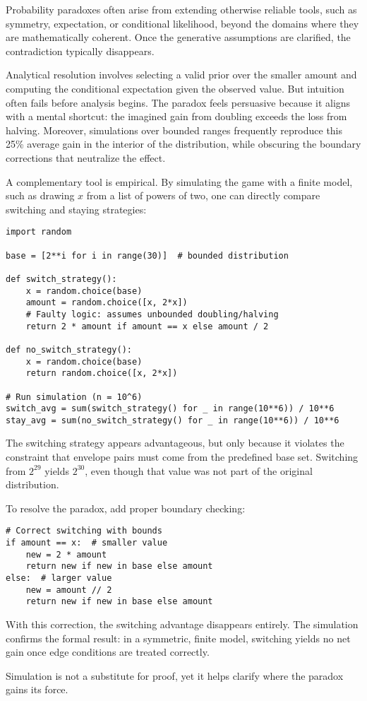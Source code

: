 \begin{commentary}
Probability paradoxes often arise from extending otherwise reliable tools, such as symmetry, expectation, or conditional likelihood, beyond the domains where they are mathematically coherent. Once the generative assumptions are clarified, the contradiction typically disappears.

Analytical resolution involves selecting a valid prior over the smaller amount and computing the conditional expectation given the observed value. But intuition often fails before analysis begins. The paradox feels persuasive because it aligns with a mental shortcut: the imagined gain from doubling exceeds the loss from halving. Moreover, simulations over bounded ranges frequently reproduce this 25\% average gain in the interior of the distribution, while obscuring the boundary corrections that neutralize the effect.

A complementary tool is empirical. By simulating the game with a finite model, such as drawing $x$ from a list of powers of two, one can directly compare switching and staying strategies:
\newpage
\begin{verbatim}
import random

base = [2**i for i in range(30)]  # bounded distribution

def switch_strategy():
    x = random.choice(base)
    amount = random.choice([x, 2*x])
    # Faulty logic: assumes unbounded doubling/halving
    return 2 * amount if amount == x else amount / 2

def no_switch_strategy():
    x = random.choice(base)
    return random.choice([x, 2*x])

# Run simulation (n = 10^6)
switch_avg = sum(switch_strategy() for _ in range(10**6)) / 10**6
stay_avg = sum(no_switch_strategy() for _ in range(10**6)) / 10**6
\end{verbatim}

The switching strategy appears advantageous, but only because it violates the constraint that envelope pairs must come from the predefined base set. Switching from \( 2^{29} \) yields \( 2^{30} \), even though that value was not part of the original distribution.

To resolve the paradox, add proper boundary checking:

\begin{verbatim}
# Correct switching with bounds
if amount == x:  # smaller value
    new = 2 * amount
    return new if new in base else amount
else:  # larger value  
    new = amount // 2
    return new if new in base else amount
\end{verbatim}

With this correction, the switching advantage disappears entirely. The simulation confirms the formal result: in a symmetric, finite model, switching yields no net gain once edge conditions are treated correctly.

Simulation is not a substitute for proof, yet it helps clarify where the paradox gains its force.

\end{commentary}